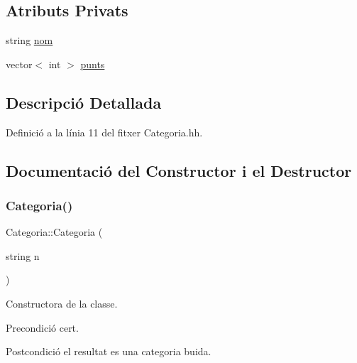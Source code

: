 \subsection*{Atributs Privats}
\begin{DoxyCompactItemize}
\item 
string \mbox{\hyperlink{class_categoria_ad39955d54081f0d7f31db96909a4f6bf}{nom}}
\item 
vector$<$ int $>$ \mbox{\hyperlink{class_categoria_a02abd0de204bc833ef030bcf0bc2bbd0}{punts}}
\end{DoxyCompactItemize}


\subsection{Descripció Detallada}


Definició a la línia 11 del fitxer Categoria.\+hh.



\subsection{Documentació del Constructor i el Destructor}
\mbox{\label{class_categoria_a789846d6b1d9b83ce793ade66870a441}} 
\subsubsection{\texorpdfstring{Categoria()}{Categoria()}}
{\footnotesize\ttfamily Categoria\+::\+Categoria (\begin{DoxyParamCaption}\item[{string}]{n }\end{DoxyParamCaption})}



Constructora de la classe. 

\begin{DoxyPrecond}{Precondició}
cert. 
\end{DoxyPrecond}
\begin{DoxyPostcond}{Postcondició}
el resultat es una categoria buida. 
\end{DoxyPostcond}
\mbox{\label{class_categoria_a2fa3d74dfe8be2db3838980de35e0eb6}} 
